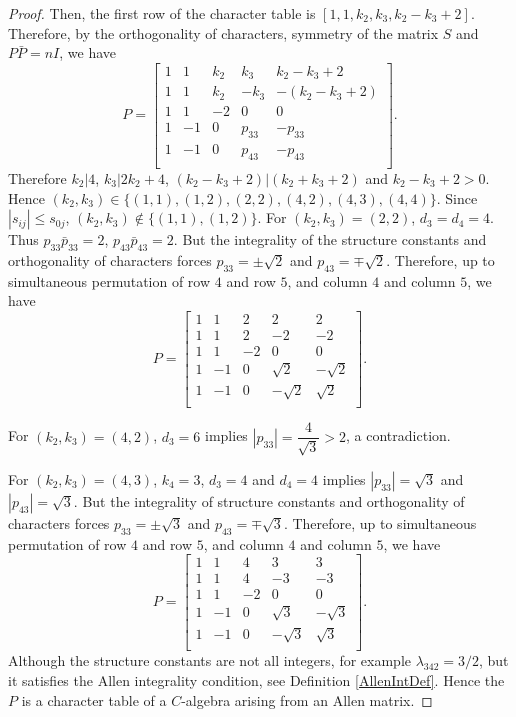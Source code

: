 \documentclass[12pt]{amsart}
\begin{document}
\begin{proof}
Then, the first row of the character table is $[1, 1, k_2, k_3, k_2-k_3+2]$.
Therefore, by the orthogonality of characters, symmetry of the matrix $S$ and $P\bar P=nI$, we have
$$P=\left[
   \begin{array}{ccccc}
     1 & 1 & k_2 &k_3&k_2-k_3+2\\
     1 & 1 &   k_2 &  -k_3&-(k_2-k_3+2)\\
      1 & 1 & -2& 0&0\\
     1 &  -1 & 0&  p_{33}& -p_{33}\\
     1 & -1 & 0&  p_{43}& -p_{43}\\
   \end{array}\right].
$$
Therefore $k_2\big|4$, $k_3\big|2k_2+4$,  $(k_2-k_3+2)\big|(k_2+k_3+2)$ and $k_2-k_3+2>0$.
Hence $(k_2,k_3)\in \{(1, 1),
(1, 2),
(2, 2),
(4, 2),
(4, 3),
(4, 4)\}$.
Since $|s_{ij}|\leq s_{0j}$, $(k_2,k_3) \not \in \{(1,1),(1,2)\}$.
For $(k_2,k_3)=(2,2)$, $d_3=d_4=4$. Thus $p_{33}\bar p_{33}=2$, $p_{43}\bar p_{43}=2$. But the integrality of the structure constants and orthogonality of characters forces $p_{33}=  \pm\sqrt{2}$  and $p_{43}=  \mp\sqrt{2}$. Therefore, up to simultaneous permutation of row $4$ and row $5$, and column $4$ and column $5$, we have
$$P=\left[
   \begin{array}{ccccc}
     1 & 1 & 2 &2&2\\
     1 & 1 &  2 &  -2&-2\\
      1 & 1 & -2& 0&0\\
     1 &  -1 & 0&   \sqrt{2} &-\sqrt{2}\\
     1 & -1 & 0&  -\sqrt{2} & \sqrt{2}\\
   \end{array}\right].
$$
\medskip

For $(k_2,k_3)=(4,2)$, $d_3=6$
implies $|p_{33}|=\dfrac{4}{\sqrt3}>2$, a contradiction.

For $(k_2,k_3)=(4,3)$, $k_4=3$, $d_3=4$ and $d_4=4$
implies $|p_{33}|= \sqrt3$ and $|p_{43}|= \sqrt3$. But the integrality of structure constants and orthogonality of characters forces $p_{33}=  \pm\sqrt{3}$  and $p_{43}=  \mp\sqrt{3}$. Therefore, up to simultaneous permutation of row $4$ and row $5$, and column $4$ and column $5$, we have
$$P=\left[
   \begin{array}{ccccc}
     1 & 1 & 4 &3&3\\
     1 & 1 &  4 &  -3&-3\\
      1 & 1 & -2& 0&0\\
    1 &  -1 & 0&   \sqrt{3} &-\sqrt{3}\\
     1 & -1 & 0&  -\sqrt{3} & \sqrt{3}\\
   \end{array}\right].
$$
Although the structure constants are not all integers, for example $\lambda_{342}=3/2$, but it satisfies the Allen integrality condition, see Definition \ref{AllenIntDef}. Hence the $P$ is a character table of a $C$-algebra arising from an Allen matrix.


\end{proof}
\end{document}
